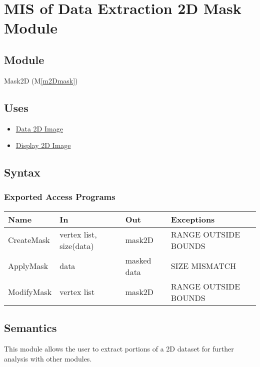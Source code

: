 \documentclass[12pt, titlepage]{article}
\newcommand{\mref}[1]{M\ref{#1}}
\begin{document}
\newpage
\section{MIS of Data Extraction 2D Mask Module} \label{Mod:Mask2D}

\subsection{Module}

Mask2D (\mref{m2Dmask})

\subsection{Uses}
\begin{itemize}
    \item \hyperref[Mod:Image]{Data 2D Image}
    \item \hyperref[Mod:Disp2D]{Display 2D Image}
\end{itemize}

\subsection{Syntax}

\subsubsection{Exported Access Programs}

\begin{center}
    \begin{tabular}{p{3cm} p{4cm} p{4cm} p{3cm}}
        \hline
        \textbf{Name} & \textbf{In} & \textbf{Out} & \textbf{Exceptions} \\
        \hline
        CreateMask & vertex list, size(data) & mask2D & RANGE OUTSIDE BOUNDS \\
        ApplyMask & data & masked data & SIZE MISMATCH\\
        ModifyMask & vertex list & mask2D & RANGE OUTSIDE BOUNDS \\
        \hline
    \end{tabular}
\end{center}

\subsection{Semantics}
This module allows the user to extract portions of a 2D dataset for further
analysis with other modules.
\end{document}
